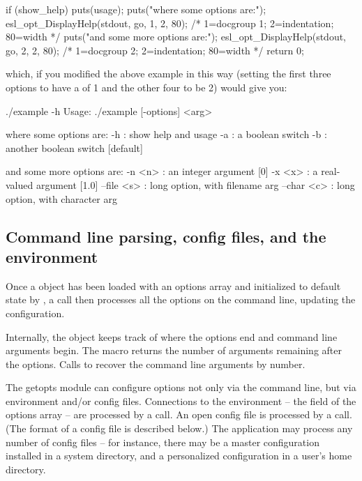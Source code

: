 \begin{cchunk}
 if (show_help) {
    puts(usage); 
    puts("\n  where some options are:");
    esl_opt_DisplayHelp(stdout, go, 1, 2, 80); /* 1=docgroup 1; 2=indentation; 80=width */
    puts("\n  and some more options are:");
    esl_opt_DisplayHelp(stdout, go, 2, 2, 80); /* 1=docgroup 2; 2=indentation; 80=width */
    return 0;
  }
\end{cchunk}

which, if you modified the above example in this way (setting the
first three options to have a  of 1 and the other
four to be 2) would give you:

\begin{cchunk}
./example -h
Usage: ./example [-options] <arg>

  where some options are:
  -h : show help and usage
  -a : a boolean switch
  -b : another boolean switch  [default]

  and some more options are:
  -n <n>     : an integer argument  [0]
  -x <x>     : a real-valued argument  [1.0]
  --file <s> : long option, with filename arg
  --char <c> : long option, with character arg
\end{cchunk}




\subsection{Command line parsing, config files, and the environment}

Once a  object has been loaded with an options
array and initialized to default state by
, a 
call then processes all the options on the command line, updating the
configuration. 

Internally, the object keeps track of where the options end and
command line arguments begin. The macro 
returns the number of arguments remaining after the options.  Calls to
 recover the command line arguments by
number.

The getopts module can configure options not only via the command
line, but via environment and/or config files.  Connections to the
environment -- the  field of the options array -- are
processed by a  call.  An open
config file is processed by a 
call. (The format of a config file is described below.) The
application may process any number of config files -- for instance,
there may be a master configuration installed in a system directory,
and a personalized configuration in a user's home directory.

